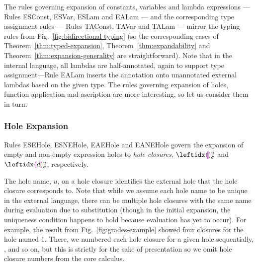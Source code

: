 The rules governing expansion of constants, variables and lambda expressions --- Rules {ESConst}, {ESVar}, {ESLam} and {EALam} --- and the corresponding type assignment rules --- Rules {TAConst}, {TAVar} and {TALam} --- mirror the typing rules from Fig.~\ref{fig:bidirectional-typing} (so the corresponding cases of Theorem~\ref{thm:typed-expansion}, Theorem~\ref{thm:expandability} and Theorem~\ref{thm:expansion-generality} are straightforward). Note that in the internal language, all lambdas are half-annotated, again to support type assignment---Rule {EALam} inserts the annotation onto unannotated external lambdas based on the given type. The rules governing expansion of holes, function application and ascription are more interesting, so let us consider them in turn.
%

\subsubsection{Hole Expansion}\label{sec:hole-expansion} Rules {ESEHole}, {ESNEHole}, {EAEHole} and {EANEHole} govern the expansion of empty and non-empty expression holes to \emph{hole closures}, $\dehole{u}{\sigma}{}$ and $\dhole{\dexp}{u}{\sigma}{}$, respectively. 
%

The hole name, $u$, on a hole closure identifies the external hole that the hole closure corresponds to. Note that while we assume each hole name to be unique in the external language, there can be multiple hole closures with the same name during evaluation due to substitution (though in the initial expansion, the uniqueness condition happens to hold because evaluation has yet to occur). For example, the result from Fig.~\ref{fig:grades-example} showed four closures for the hole named 1. There, we numbered each hole closure for a given hole sequentially, ,  and so on, but this is strictly for the sake of presentation so we omit hole closure numbers from the core calculus.

